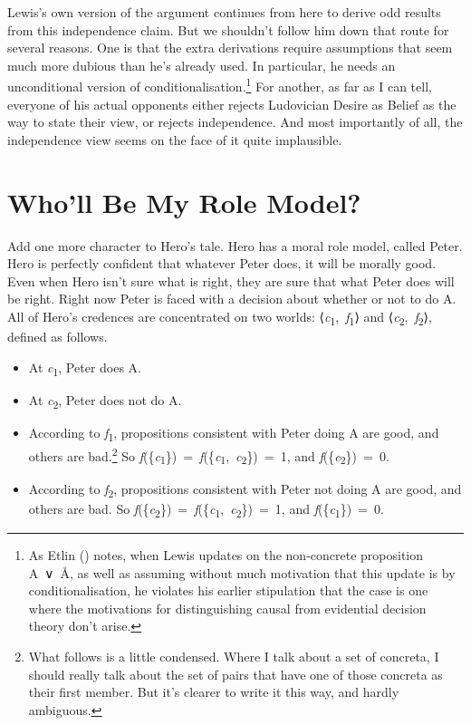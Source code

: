 \documentclass[
  11pt,
  letterpaper,
  DIV=11,
  numbers=noendperiod,
  twoside]{scrartcl}
\providecommand{\tightlist}{%
  \setlength{\itemsep}{0pt}\setlength{\parskip}{0pt}}\usepackage{longtable,booktabs,array}
\begin{document}
Lewis's own version of the argument continues from here to derive odd
results from this independence claim. But we shouldn't follow him down
that route for several reasons. One is that the extra derivations
require assumptions that seem much more dubious than he's already used.
In particular, he needs an unconditional version of
conditionalisation.\footnote{As Etlin () notes, when Lewis updates on the non-concrete proposition A~∨~Å,
  as well as assuming without much motivation that this update is by
  conditionalisation, he violates his earlier stipulation that the case
  is one where the motivations for distinguishing causal from evidential
  decision theory don't arise.} For another, as far as I can tell,
everyone of his actual opponents either rejects Ludovician Desire as
Belief as the way to state their view, or rejects independence. And most
importantly of all, the independence view seems on the face of it quite
implausible.

\section{Who'll Be My Role Model?}\label{wholl-be-my-role-model}

Add one more character to Hero's tale. Hero has a moral role model,
called Peter. Hero is perfectly confident that whatever Peter does, it
will be morally good. Even when Hero isn't sure what is right, they are
sure that what Peter does will be right. Right now Peter is faced with a
decision about whether or not to do A. All of Hero's credences are
concentrated on two worlds:
⟨\emph{c}\textsubscript{1},~\emph{f}\textsubscript{1}⟩ and
⟨\emph{c}\textsubscript{2},~\emph{f}\textsubscript{2}⟩, defined as
follows.

\begin{itemize}
\tightlist
\item
  At \emph{c}\textsubscript{1}, Peter does A.
\item
  At \emph{c}\textsubscript{2}, Peter does not do A.
\item
  According to \emph{f}\textsubscript{1}, propositions consistent with
  Peter doing A are good, and others are bad.\footnote{What follows is a
    little condensed. Where I talk about a set of concreta, I should
    really talk about the set of pairs that have one of those concreta
    as their first member. But it's clearer to write it this way, and
    hardly ambiguous.} So
  \emph{f}(\{\emph{c}\textsubscript{1}\})~=~\emph{f}(\{\emph{c}\textsubscript{1},~\emph{c}\textsubscript{2}\})~=~1,
  and \emph{f}(\{\emph{c}\textsubscript{2}\})~=~0.
\item
  According to \emph{f}\textsubscript{2}, propositions consistent with
  Peter not doing A are good, and others are bad. So
  \emph{f}(\{\emph{c}\textsubscript{2}\})~=~\emph{f}(\{\emph{c}\textsubscript{1},~\emph{c}\textsubscript{2}\})~=~1,
  and \emph{f}(\{\emph{c}\textsubscript{1}\})~=~0.
\end{itemize}
\end{document}
